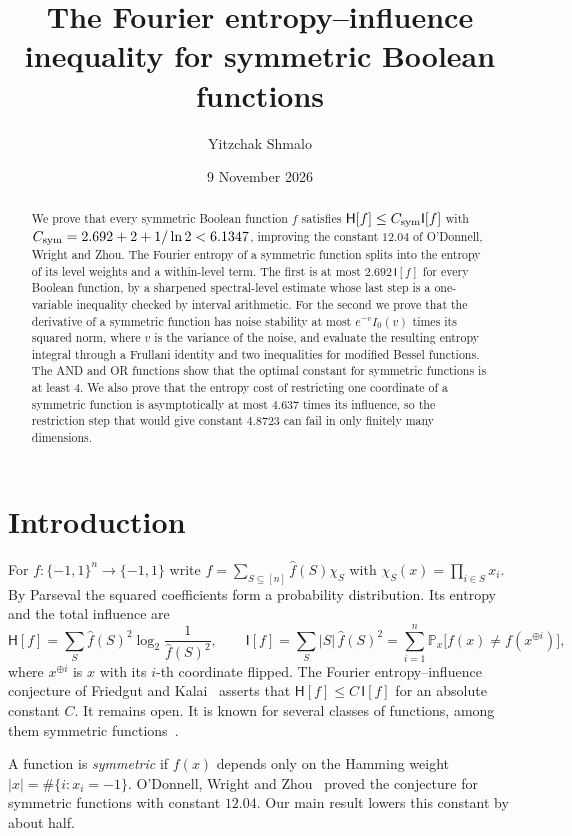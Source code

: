 \documentclass[11pt]{amsart}
\title[Fourier entropy of symmetric functions]{The Fourier entropy--influence inequality for symmetric Boolean functions}
\author{Yitzchak Shmalo}
\date{9 November 2026}
\theoremstyle{definition}
\theoremstyle{remark}
\newcommand{\bits}{\{-1,1\}}
\renewcommand{\P}{\mathbb P}
\newcommand{\HH}{\mathsf H}
\newcommand{\I}{\mathsf I}
\newcommand{\wh}[1]{\widehat{#1}}
\begin{document}
\begin{abstract}
We prove that every symmetric Boolean function $f$ satisfies
$\HH[f]\le C_{\rm sym}\I[f]$ with $C_{\rm sym}=2.692+2+1/\ln 2<6.1347$, improving the constant $12.04$ of O'Donnell, Wright and Zhou. The Fourier entropy of a symmetric function splits into the entropy of its level weights and a within-level term. The first is at most $2.692\,\I[f]$ for every Boolean function, by a sharpened spectral-level estimate whose last step is a one-variable inequality checked by interval arithmetic. For the second we prove that the derivative of a symmetric function has noise stability at most $e^{-v}I_0(v)$ times its squared norm, where $v$ is the variance of the noise, and evaluate the resulting entropy integral through a Frullani identity and two inequalities for modified Bessel functions. The AND and OR functions show that the optimal constant for symmetric functions is at least $4$. We also prove that the entropy cost of restricting one coordinate of a symmetric function is asymptotically at most $4.637$ times its influence, so the restriction step that would give constant $4.8723$ can fail in only finitely many dimensions.
\end{abstract}
\maketitle

\section{Introduction}

For $f:\bits^n\to\bits$ write $f=\sum_{S\subseteq[n]}\wh f(S)\chi_S$ with $\chi_S(x)=\prod_{i\in S}x_i$. By Parseval the squared coefficients form a probability distribution. Its entropy and the total influence are
\[
 \HH[f]=\sum_{S}\wh f(S)^2\log_2\frac{1}{\wh f(S)^2},\qquad
 \I[f]=\sum_S|S|\,\wh f(S)^2=\sum_{i=1}^n\P_x\bigl[f(x)\ne f(x^{\oplus i})\bigr],
\]
where $x^{\oplus i}$ is $x$ with its $i$-th coordinate flipped. The Fourier entropy--influence conjecture of Friedgut and Kalai~\cite{FK96} asserts that $\HH[f]\le C\,\I[f]$ for an absolute constant $C$. It remains open. It is known for several classes of functions, among them symmetric functions~\cite{OWZ11,KMS12,CKLS16,ACKSW21,Shm26}.

A function is \emph{symmetric} if $f(x)$ depends only on the Hamming weight $|x|=\#\{i:x_i=-1\}$. O'Donnell, Wright and Zhou~\cite{OWZ11} proved the conjecture for symmetric functions with constant $12.04$. Our main result lowers this constant by about half.
\end{document}
